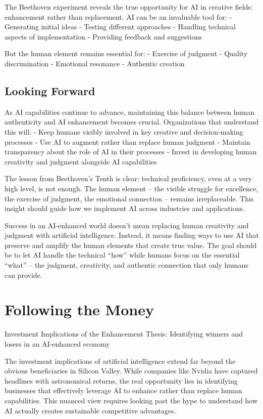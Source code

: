 \documentclass[
  Letterpaper,
]{scrbook}
\begin{document}
The Beethoven experiment reveals the true opportunity for AI in creative
fields: enhancement rather than replacement. AI can be an invaluable
tool for: - Generating initial ideas - Testing different approaches -
Handling technical aspects of implementation - Providing feedback and
suggestions

But the human element remains essential for: - Exercise of judgment -
Quality discrimination - Emotional resonance - Authentic creation

\section{Looking Forward}\label{looking-forward}

As AI capabilities continue to advance, maintaining this balance between
human authenticity and AI enhancement becomes crucial. Organizations
that understand this will: - Keep humans visibly involved in key
creative and decision-making processes - Use AI to augment rather than
replace human judgment - Maintain transparency about the role of AI in
their processes - Invest in developing human creativity and judgment
alongside AI capabilities

The lesson from Beethoven's Tenth is clear: technical proficiency, even
at a very high level, is not enough. The human element -- the visible
struggle for excellence, the exercise of judgment, the emotional
connection -- remains irreplaceable. This insight should guide how we
implement AI across industries and applications.

Success in an AI-enhanced world doesn't mean replacing human creativity
and judgment with artificial intelligence. Instead, it means finding
ways to use AI that preserve and amplify the human elements that create
true value. The goal should be to let AI handle the technical ``how''
while humans focus on the essential ``what'' -- the judgment,
creativity, and authentic connection that only humans can provide.


\chapter{Following the Money}\label{following-the-money}

Investment Implications of the Enhancement Thesis: Identifying winners
and losers in an AI-enhanced economy

\hfill\break

The investment implications of artificial intelligence extend far beyond
the obvious beneficiaries in Silicon Valley. While companies like Nvidia
have captured headlines with astronomical returns, the real opportunity
lies in identifying businesses that effectively leverage AI to enhance
rather than replace human capabilities. This nuanced view requires
looking past the hype to understand how AI actually creates sustainable
competitive advantages.
\end{document}

